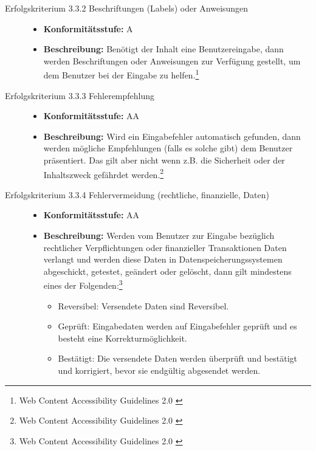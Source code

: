 \begin{description}
\begin{description}
		\item[Erfolgskriterium 3.3.2 Beschriftungen (Labels) oder Anweisungen]\hfill
		\begin{itemize}
			\item \textbf{Konformitätsstufe:} A
			\item \textbf{Beschreibung:} Benötigt der Inhalt eine Benutzereingabe, dann werden Beschriftungen oder Anweisungen zur Verfügung gestellt, um dem Benutzer bei der 
			Eingabe zu helfen.\footnote{Web Content Accessibility Guidelines 2.0 \cite{WCAG2.0}}
		\end{itemize}
		
		\item[Erfolgskriterium 3.3.3 Fehlerempfehlung]\hfill
		\begin{itemize}
			\item \textbf{Konformitätsstufe:} AA
			\item \textbf{Beschreibung:} Wird ein Eingabefehler automatisch gefunden, dann werden mögliche Empfehlungen (falls es solche gibt) dem Benutzer präsentiert. Das gilt aber 
			nicht wenn z.B. die Sicherheit oder der Inhaltszweck gefährdet werden.\footnote{Web Content Accessibility Guidelines 2.0 \cite{WCAG2.0}}
		\end{itemize}
		
		\item[Erfolgskriterium 3.3.4 Fehlervermeidung (rechtliche, finanzielle, Daten)]\hfill
		\begin{itemize}
			\item \textbf{Konformitätsstufe:} AA
			\item \textbf{Beschreibung:} Werden vom Benutzer zur Eingabe bezüglich rechtlicher Verpflichtungen oder finanzieller Transaktionen Daten verlangt und werden diese Daten 
			in Datenspeicherungssystemen abgeschickt, getestet, geändert oder gelöscht, dann gilt mindestens eines der 
			Folgenden:\footnote{Web Content Accessibility Guidelines 2.0 \cite{WCAG2.0}}
			\begin{itemize}
				\item Reversibel: Versendete Daten sind Reversibel.
				\item Geprüft: Eingabedaten werden auf Eingabefehler geprüft und es besteht eine Korrekturmöglichkeit. 
				\item Bestätigt: Die versendete Daten werden überprüft und bestätigt und korrigiert, bevor sie endgültig abgesendet werden. 
			\end{itemize}
		\end{itemize}
		

\end{description}
\end{description}
